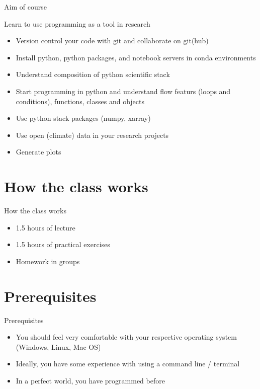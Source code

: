 \documentclass[10pt,color=usenames,dvipsnames]{beamer}
\begin{document}
\begin{frame}{Aim of course}
	
	Learn to use programming as a tool in research
	
	\begin{itemize}
		\item Version control your code with git and collaborate on git(hub)
		\item Install python, python packages, and notebook servers in conda environments
		\item Understand composition of python scientific stack
		\item Start programming in python and understand flow featurs (loops and conditions), functions, classes and objects
		\item Use python stack packages (numpy, xarray)
		\item Use open (climate) data in your research projects
		\item Generate plots
	\end{itemize}
	
\end{frame}

\section{How the class works}

\begin{frame}{How the class works}
	
	\begin{itemize}
		\item 1.5 hours of lecture
		\item 1.5 hours of practical exercises
		\item Homework in groups
	\end{itemize}	

\end{frame}

\section{Prerequisites}

\begin{frame}{Prerequisites}
	
	\begin{itemize}
		\item You should feel very comfortable with your respective operating system (Windows, Linux, Mac OS)
		\item Ideally, you have some experience with using a command line / terminal
		\item In a perfect world, you have programmed before
	\end{itemize}
	
\end{frame}
\end{document}

